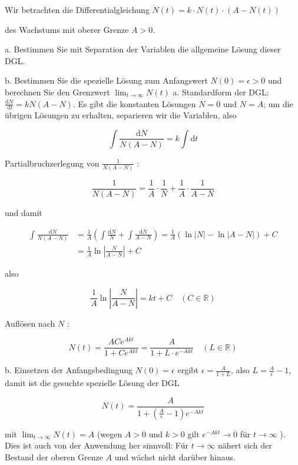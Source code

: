 \begin{example}
    Wir betrachten die Differentialgleichung
$
\dot{N}(t)=k \cdot N(t) \cdot(A-N(t))
$

des Wachstums mit oberer Grenze $A>0$.

a. Bestimmen Sie mit Separation der Variablen die allgemeine Lösung dieser DGL.

b. Bestimmen Sie die spezielle Lösung zum Anfangswert $N(0)=\epsilon>0$ und berechnen Sie den Grenzwert $\lim _{t \rightarrow \infty} N(t)$
\tcblower
a. Standardform der DGL: $\frac{\mathrm{d} N}{\mathrm{~d} t}=k N(A-N)$. Es gibt die konstanten Lösungen $N=0$ und $N=A$; um die übrigen Lösungen zu erhalten, separieren wir die Variablen, also

$$
\int \frac{\mathrm{d} N}{N(A-N)}=k \int \mathrm{d} t
$$

Partialbruchzerlegung von $\frac{1}{N(A-N)}$ :

$$
\frac{1}{N(A-N)}=\frac{1}{A} \cdot \frac{1}{N}+\frac{1}{A} \cdot \frac{1}{A-N}
$$

und damit

$$
\begin{aligned}
\int \frac{\mathrm{d} N}{N(A-N)} & =\frac{1}{A}\left(\int \frac{\mathrm{d} N}{N}+\int \frac{\mathrm{d} N}{A-N}\right)=\frac{1}{A}(\ln |N|-\ln |A-N|)+C \\
& =\frac{1}{A} \ln \left|\frac{N}{A-N}\right|+C
\end{aligned}
$$

also

$$
\frac{1}{A} \ln \left|\frac{N}{A-N}\right|=k t+C \quad(C \in \mathbb{R})
$$

Auflösen nach $N$ :

$$
N(t)=\frac{A C e^{A k t}}{1+C e^{A k t}}=\frac{A}{1+L \cdot e^{-A k t}} \quad(L \in \mathbb{R})
$$

b. Einsetzen der Anfangsbedingung $N(0)=\epsilon$ ergibt $\epsilon=\frac{A}{1+L}$, also $L=\frac{A}{\epsilon}-1$, damit ist die gesuchte spezielle Lösung der DGL

$$
N(t)=\frac{A}{1+\left(\frac{A}{\epsilon}-1\right) e^{-A k t}}
$$

mit $\lim _{t \rightarrow \infty} N(t)=A$ (wegen $A>0$ und $k>0$ gilt $e^{-A k t} \rightarrow 0$ für $t \rightarrow \infty$ ). Dies ist auch von der Anwendung her sinnvoll: Für $t \rightarrow \infty$ nähert sich der Bestand der oberen Grenze $A$ und wächst nicht darüber hinaus.

\end{example}




